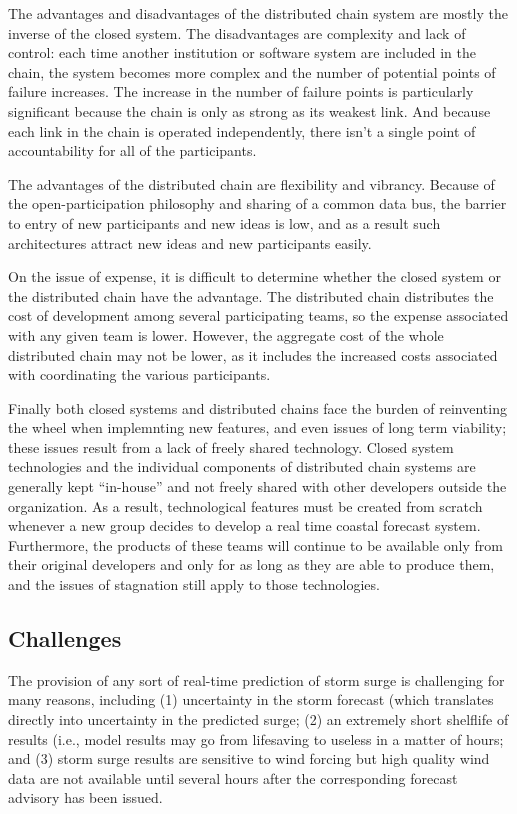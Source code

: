 \documentclass[12pt]{article}
\begin{document}
The advantages and disadvantages of the distributed chain system are 
mostly the inverse of the closed system. The disadvantages are 
complexity and lack of control: each time another institution or 
software system are included in the chain, the system becomes more 
complex and the number of potential points of failure increases. The 
increase in the number of failure points is particularly significant 
because the chain is only as strong as its weakest link. And because 
each link in the chain is operated independently, there isn't a 
single point of accountability for all of the participants.

The advantages of the distributed chain are flexibility and 
vibrancy. Because of the open-participation philosophy and sharing 
of a common data bus, the barrier to entry of new participants and 
new ideas is low, and as a result such architectures attract new 
ideas and new participants easily.

On the issue of expense, it is difficult to determine whether the 
closed system or the distributed chain have the advantage. The 
distributed chain distributes the cost of development among several 
participating teams, so the expense associated with any given team 
is lower. However, the aggregate cost of the whole distributed chain 
may not be lower, as it includes the increased costs associated with 
coordinating the various participants. 

Finally both closed systems and distributed chains face the burden 
of reinventing the wheel when implemnting new features, and even 
issues of long term viability; these issues result from a lack of 
freely shared technology. Closed system technologies and the 
individual components of distributed chain systems are generally 
kept ``in-house'' and not freely shared with other developers 
outside the organization. As a result, technological features must 
be created from scratch whenever a new group decides to develop a 
real time coastal forecast system. Furthermore, the products of 
these teams will continue to be available only from their original 
developers and only for as long as they are able to produce them, 
and the issues of stagnation still apply to those technologies.

\subsection{Challenges}

The provision of any sort of real-time prediction of storm surge is 
challenging for many reasons, including (1) uncertainty in the storm 
forecast (which translates directly into uncertainty in the 
predicted surge; (2) an extremely short shelflife of results (i.e., 
model results may go from lifesaving to useless in a matter of 
hours; and (3) storm surge results are sensitive to wind forcing but 
high quality wind data are not available until several hours after 
the corresponding forecast advisory has been issued. 
\end{document}
